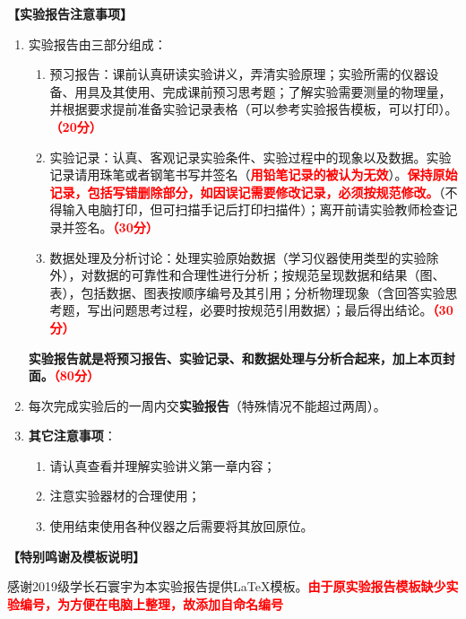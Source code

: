 \documentclass[dvipsnames, svgnames,a4paper,11pt]{article}
\begin{document}
	\textbf{【实验报告注意事项】}
	\begin{enumerate}
		\item 实验报告由三部分组成：
		\begin{enumerate}
			\item 预习报告：课前认真研读实验讲义，弄清实验原理；实验所需的仪器设备、用具及其使用、完成课前预习思考题；了解实验需要测量的物理量，并根据要求提前准备实验记录表格（可以参考实验报告模板，可以打印）。\textcolor{red}{\textbf{（20分）}}
			\item 实验记录：认真、客观记录实验条件、实验过程中的现象以及数据。实验记录请用珠笔或者钢笔书写并签名（\textcolor{red}{\textbf{用铅笔记录的被认为无效}}）。\textcolor{red}{\textbf{保持原始记录，包括写错删除部分，如因误记需要修改记录，必须按规范修改。}}（不得输入电脑打印，但可扫描手记后打印扫描件）；离开前请实验教师检查记录并签名。\textcolor{red}{\textbf{（30分）}}
			\item 数据处理及分析讨论：处理实验原始数据（学习仪器使用类型的实验除外），对数据的可靠性和合理性进行分析；按规范呈现数据和结果（图、表），包括数据、图表按顺序编号及其引用；分析物理现象（含回答实验思考题，写出问题思考过程，必要时按规范引用数据）；最后得出结论。\textcolor{red}{\textbf{（30分）}}
		\end{enumerate}
		\textbf{实验报告就是将预习报告、实验记录、和数据处理与分析合起来，加上本页封面。\textcolor{red}{（80分）}}
		\item 每次完成实验后的一周内交\textbf{实验报告}（特殊情况不能超过两周）。
		\item \textbf{其它注意事项}：
		\begin{enumerate}
			\item 请认真查看并理解实验讲义第一章内容；
			\item 注意实验器材的合理使用；
			\item 使用结束使用各种仪器之后需要将其放回原位。
		\end{enumerate}
	\end{enumerate}
	
	
	
	\textbf{【特别鸣谢及模板说明】}	
	
	感谢2019级学长石寰宇为本实验报告提供\LaTeX 模板。\textcolor{red}{\textbf{由于原实验报告模板缺少实验编号，为方便在电脑上整理，故添加自命名编号}}
	
\end{document}

